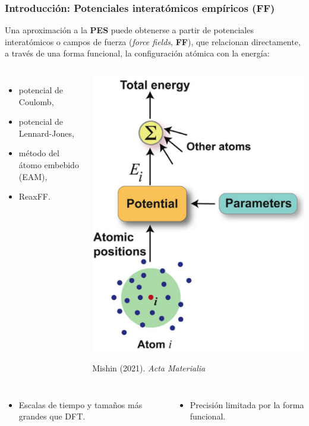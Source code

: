 \documentclass[aspectratio=169]{beamer}
\let\oldtextbf\textbf
\renewcommand{\textbf}[1]{\textcolor{nordblue}{\oldtextbf{#1}}}
\begin{document}
    \begin{frame}
        \frametitle{Introducción: Potenciales interatómicos empíricos (FF)}

        Una aproximación a la \textbf{PES} puede obtenerse a partir de potenciales
        interatómicos o campos de fuerza (\textit{force fields}, \textbf{FF}), que
        relacionan directamente, a través de una forma funcional, la configuración
        atómica con la energía:
        
        \pause

        \begin{columns}
            \begin{itemize}
                \item potencial de Coulomb,
                \item potencial de Lennard-Jones,
                \item método del átomo embebido (EAM),
                \item ReaxFF.
            \end{itemize}
            \begin{center}
                \includegraphics[width=0.4\columnwidth]{intro-ff.png}
        
                \tiny{Mishin (2021). \textit{Acta Materialia}}
            \end{center}
        \end{columns}

        \pause
        
        \begin{columns}
            \begin{itemize}
                \item Escalas de tiempo y tamaños más grandes que DFT.
            \end{itemize}

            \begin{itemize}
                \item Precisión limitada por la forma funcional.
            \end{itemize}
        \end{columns}

	\end{frame}
    
\end{document}
